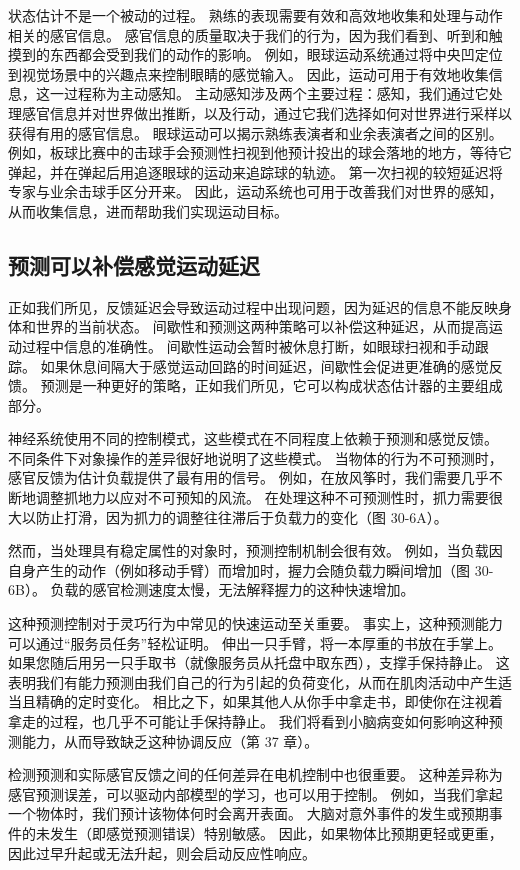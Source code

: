 状态估计不是一个被动的过程。 熟练的表现需要有效和高效地收集和处理与动作相关的感官信息。 感官信息的质量取决于我们的行为，因为我们看到、听到和触摸到的东西都会受到我们的动作的影响。 例如，眼球运动系统通过将中央凹定位到视觉场景中的兴趣点来控制眼睛的感觉输入。 因此，运动可用于有效地收集信息，这一过程称为主动感知。 主动感知涉及两个主要过程：感知，我们通过它处理感官信息并对世界做出推断，以及行动，通过它我们选择如何对世界进行采样以获得有用的感官信息。 眼球运动可以揭示熟练表演者和业余表演者之间的区别。 例如，板球比赛中的击球手会预测性扫视到他预计投出的球会落地的地方，等待它弹起，并在弹起后用追逐眼球的运动来追踪球的轨迹。 第一次扫视的较短延迟将专家与业余击球手区分开来。 因此，运动系统也可用于改善我们对世界的感知，从而收集信息，进而帮助我们实现运动目标。


\subsection{预测可以补偿感觉运动延迟}

正如我们所见，反馈延迟会导致运动过程中出现问题，因为延迟的信息不能反映身体和世界的当前状态。 间歇性和预测这两种策略可以补偿这种延迟，从而提高运动过程中信息的准确性。 间歇性运动会暂时被休息打断，如眼球扫视和手动跟踪。 如果休息间隔大于感觉运动回路的时间延迟，间歇性会促进更准确的感觉反馈。 预测是一种更好的策略，正如我们所见，它可以构成状态估计器的主要组成部分。

神经系统使用不同的控制模式，这些模式在不同程度上依赖于预测和感觉反馈。 不同条件下对象操作的差异很好地说明了这些模式。 当物体的行为不可预测时，感官反馈为估计负载提供了最有用的信号。 例如，在放风筝时，我们需要几乎不断地调整抓地力以应对不可预知的风流。 在处理这种不可预测性时，抓力需要很大以防止打滑，因为抓力的调整往往滞后于负载力的变化（图 30-6A）。

然而，当处理具有稳定属性的对象时，预测控制机制会很有效。 例如，当负载因自身产生的动作（例如移动手臂）而增加时，握力会随负载力瞬间增加（图 30-6B）。 负载的感官检测速度太慢，无法解释握力的这种快速增加。

这种预测控制对于灵巧行为中常见的快速运动至关重要。 事实上，这种预测能力可以通过“服务员任务”轻松证明。 伸出一只手臂，将一本厚重的书放在手掌上。 如果您随后用另一只手取书（就像服务员从托盘中取东西），支撑手保持静止。 这表明我们有能力预测由我们自己的行为引起的负荷变化，从而在肌肉活动中产生适当且精确的定时变化。 相比之下，如果其他人从你手中拿走书，即使你在注视着拿走的过程，也几乎不可能让手保持静止。 我们将看到小脑病变如何影响这种预测能力，从而导致缺乏这种协调反应（第 37 章）。

检测预测和实际感官反馈之间的任何差异在电机控制中也很重要。 这种差异称为感官预测误差，可以驱动内部模型的学习，也可以用于控制。 例如，当我们拿起一个物体时，我们预计该物体何时会离开表面。 大脑对意外事件的发生或预期事件的未发生（即感觉预测错误）特别敏感。 因此，如果物体比预期更轻或更重，因此过早升起或无法升起，则会启动反应性响应。

